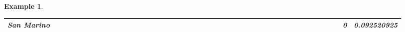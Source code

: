 \documentclass[a4paper,11pt]{report}
\newtheorem{example}[theorem]{Example}
\begin{document}
\begin{example}
\begin{appendices}
\begin{landscape}
\begin{longtable}{r|r|r|r|r|r|r|r|r|r|r|r|r|r|r|r|r|r|r|r|r|r|r|r|r|r|r|r|r|r|r|r|r|r|r|r|r|r|r|r|r|r|r|r|}
\multicolumn{1}{|r|}{\textbf{San Marino}}      &                                       &                                       &                                       &                                          &                                       &                                       &                                        &                                       &                                      &                                       &                                       &                                                &                                       &                                      &                                       &                                       &                                      &                                       &                                       &                                       &                                      &                                     &                                      &                                         &                                     &                                       &                                          &                                      &                                       &                                      &                                          &                                      &                                        &                                     &                                      &                                           &                                               &                                       &                                              &                                      &                                     & 0                                             & 0.092520925                             \\ \hline

\end{longtable}
\end{landscape}
\end{appendices}
\end{example}
\end{document}
